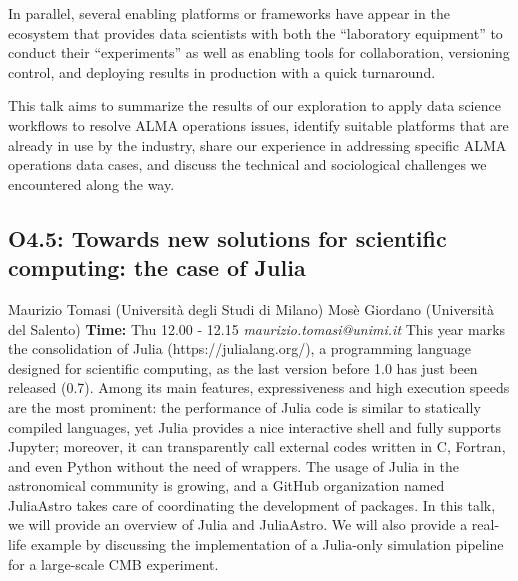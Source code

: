 \documentclass{report}
\begin{document}
In parallel, several enabling platforms or frameworks have appear in the ecosystem that provides data scientists with both the “laboratory equipment” to conduct their “experiments” as well as enabling tools for collaboration, versioning control, and deploying results in production with a quick turnaround.

This talk aims to summarize the results of our exploration to apply data science workflows to resolve ALMA operations issues, identify suitable platforms that are already in use by the industry, share our experience in addressing specific ALMA operations data cases, and discuss the technical and sociological challenges we encountered along the way.​​\newline
\newpage
\subsection*{O4.5: Towards new solutions for scientific computing: the case of Julia}
\bigskip
Maurizio Tomasi (Università degli Studi di Milano) \newline Mosè Giordano (Università del Salento) \newline   \newline   \newline  \newline  \newline\newline
{\bf Time:} Thu 12.00 - 12.15\newline
\newline
{\it maurizio.tomasi@unimi.it}\newline
\newline\newline
This year marks the consolidation of Julia (https://julialang.org/), a programming language designed for scientific computing, as the last version before 1.0 has just been released (0.7). Among its main features, expressiveness and high execution speeds are the most prominent: the performance of Julia code is similar to statically compiled languages, yet Julia provides a nice interactive shell and fully supports Jupyter; moreover, it can transparently call external codes written in C, Fortran, and even Python without the need of wrappers. The usage of Julia in the astronomical community is growing, and a GitHub organization named JuliaAstro takes care of coordinating the development of packages. In this talk, we will provide an overview of Julia and JuliaAstro. We will also provide a real-life example by discussing the implementation of a Julia-only simulation pipeline for a large-scale CMB experiment.\newline
\newpage
\end{document}
